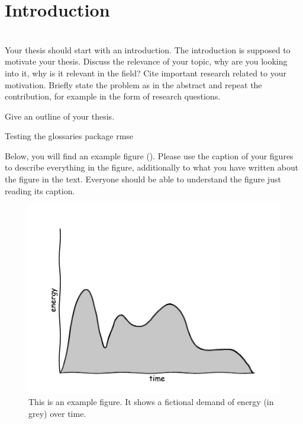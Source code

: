 \chapter{Introduction}
\label{ch:Introduction}

 \\

Your thesis should start with an introduction. The introduction is supposed to motivate your thesis.
Discuss the relevance of your topic, why are you looking into it, why is it relevant in the field? Cite important research related to your motivation.
Briefly state the problem as in the abstract and repeat the contribution, for example in the form of research questions. 

Give an outline of your thesis.

Testing the glossaries package \gls{rmse}


Below, you will find an example figure (). Please use the caption of your figures to describe everything in the figure, additionally to what you have written about the figure in the text. Everyone should be able to understand the figure just reading its caption.

\begin{figure}[h!]%
\centering
\includegraphics[width=0.5\columnwidth]{plots/Figure_2_demand}%
\caption{This is an example figure. It shows a fictional demand of energy (in grey) over time.}%
\label{fig:example}%
\end{figure}
